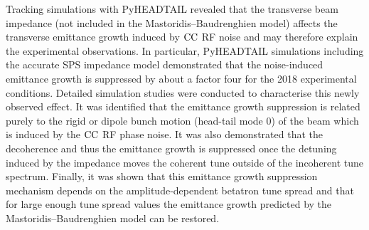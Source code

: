 Tracking simulations with PyHEADTAIL revealed that the transverse beam impedance (not included in the Mastoridis--Baudrenghien model) affects the transverse emittance growth induced by ${\mathrm{CC}}$ RF noise and may therefore explain the experimental observations. In particular, PyHEADTAIL simulations including the accurate SPS impedance model demonstrated that the noise-induced emittance growth is suppressed by about a factor four for the 2018 experimental conditions. Detailed simulation studies were conducted to characterise this newly observed effect. It was identified that the emittance growth suppression is related purely to the rigid or dipole bunch motion (head-tail mode 0) of the beam which is induced by the ${\mathrm{CC}}$ RF phase noise. It was also demonstrated that the decoherence and thus the emittance growth is suppressed once the detuning induced by the impedance moves the coherent tune outside of the incoherent tune spectrum. Finally, it was shown that this emittance growth suppression mechanism depends on the amplitude-dependent betatron tune spread and that for large enough tune spread values the emittance growth predicted by the Mastoridis--Baudrenghien model can be restored.



